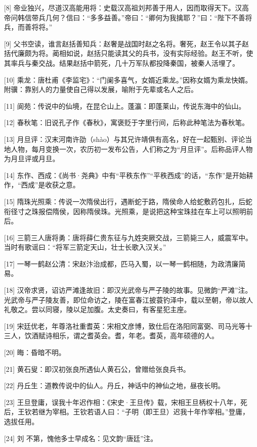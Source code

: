 \documentclass[12pt,UTF8]{ctexbook}
\begin{document}
[8] 帝业独兴，尽道汉高能用将：史载汉高祖刘邦善于用人，因而取得天下。汉高帝问韩信带兵几何？信曰：“多多益善。”帝曰：“卿何为我擒耶？”曰：“陛下不善将兵，而善将将。”

[9] 父书空读，谁言赵括善知兵：赵奢是战国时赵之名将。奢死，赵王令以其子赵括代廉颇为将。蔺相如说，赵括只能读其父的兵书，没有实际经验。赵王不听，使其率兵与秦交战。结果赵括中箭死，几十万军队都投降秦国，被秦人活埋了。

[10] 乘龙：唐杜甫《李监宅》：“门阑多喜气，女婿近乘龙。”因称女婿为乘龙快婿。附骥：靠别人的力量使自己得以发展，喻附于先辈或名人之后。

[11] 阆苑：传说中的仙境，在昆仑山上。蓬瀛：即蓬莱山，传说东海中的仙山。

[12] 春秋笔：旧说孔子作《春秋》，寓褒贬于字里行间，后称此种笔法为春秋笔。

[13] 月旦评：汉末河南许劭（shào）与其兄许靖俱有高名，好在一起甄别、评论当地人物，每月变换一次，农历初一发布公告，人们称之为“月旦评”。后称品评人物为月旦评或月旦。

[14] 东作、西成：《尚书·尧典》中有“平秩东作”“平秩西成”的话，“东作”是开始耕作，“西成”是收获之意。

[15] 隋珠光照乘：传说一次隋侯出行，遇断蛇于路，隋侯命人给蛇敷药包扎，后蛇衔径寸之珠报偿隋侯，因称隋侯珠。光照乘，是说把这种宝珠挂在车上可以照明前后。

[16] 三箭三人唐将勇：唐将薛仁贵东征与九姓突厥交战，三箭毙三人，威震军中。当时有歌谣曰：“将军三箭定天山，壮士长歌入汉关。”

[17] 一琴一鹤赵公清：宋赵汴治成都，匹马入蜀，以一琴一鹤相随，为政清廉简易。

[18] 汉帝求贤，诏访严滩逢故旧：即汉光武帝与严子陵的故事。见微韵“严滩”注。光武帝与严子陵友善，即位命访之，陵在富春江披蓑钓泽中，载以至朝，帝以故人礼敬之。尝以同寝，陵以足加腹。太史奏曰，有客星犯主座。

[19] 宋廷优老，年尊洛社重耆英：宋相文彦博，致仕后在洛阳同富弼、司马光等十三人，饮酒赋诗相乐，谓之耆英会。耆，年老。耆英，高年硕德的人。

[20] 晦：昏暗不明。

[21] 黄石叟：即汉初张良所遇仙人黄石公，曾赠给张良兵书。

[22] 丹丘生：道教传说中的仙人。丹丘，神话中的神仙之地，昼夜长明。

[23] 王旦登庸，误我十年迟作相：《宋史·王旦传》载，宋相王旦柄权十八年，死后，王钦若继为宰相。王钦若语人曰：“子明（即王旦）迟我十年作宰相。”登庸，选拔任用。

[24] 刘 不第，愧他多士早成名：见文韵“唐廷”注。
\end{document}
